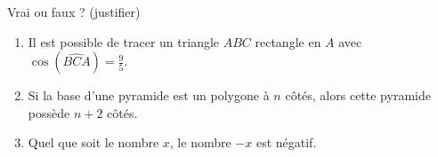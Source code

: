 
\begin{exercice}\label{exo2smath-0272}


    Vrai ou faux ? (justifier)
    \begin{enumerate}
        \item
            Il est possible de tracer un triangle \( ABC\) rectangle en \( A\) avec \( \cos(\widehat{BCA})=\frac{ 9 }{ 5 }\).
        \item
            Si la base d'une pyramide est un polygone à \( n\) côtés, alors cette pyramide possède \( n+2\) côtés.
        \item
            Quel que soit le nombre \( x\), le nombre \( -x\) est négatif.
    \end{enumerate}

\end{exercice}
